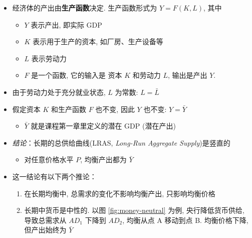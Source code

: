 \documentclass[10pt]{ctexart}
\begin{document}
\begin{itemize}
\item
  经济体的产出由\textbf{生产函数}决定. 生产函数形式为 \(Y = F(K, L)\), 其中
  \begin{itemize}
    \item
      $Y$ 表示产出, 即实际 GDP
    \item
      $K$ 表示用于生产的资本, 如厂房、生产设备等
    \item
      $L$ 表示劳动力
    \item
      $F$ 是一个函数, 它的输入是
      资本 $K$ 和劳动力 $L$,  输出是产出 $Y$.
    \end{itemize}
\item
  由于劳动力处于充分就业状态, $L$ 为常数: \(L = \bar L\)
\item
  假定资本 $K$ 和生产函数 $F$ 也不变, 因此 $Y$ 也不变: \(Y = \bar Y\)

  \begin{itemize}
  \item
    \(\bar Y\) 就是课程第一章里定义的潜在 GDP (潜在产出)
  \end{itemize}
\item
  \textit{结论}：长期的总供给曲线(LRAS,  \textit{Long-Run Aggregate Supply})是竖直的

  \begin{itemize}
  \item
    对任意价格水平 $P$,  均衡产出都为 \(\bar Y\)
  \end{itemize}
\item 这一结论有以下两个推论：
  \begin{enumerate}
    \item  在长期均衡中, 总需求的变化不影响均衡产出, 只影响均衡价格
    \item  长期中货币是中性的. 以图 \ref{fig:money-neutral} 为例, 央行降低货币供给, 导致总需求从 $AD_1$ 下降到 $AD_2$,  均衡从点 A
    移动到点 B. 均衡价格下降, 但产出始终为 $\bar Y$
  \end{enumerate}






\begin{figure}
\centering
{}
\end{figure}
\end{itemize}
\end{document}

